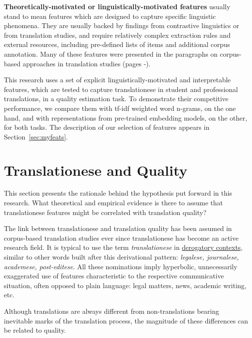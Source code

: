 \textbf{Theoretically-motivated or linguistically-motivated features} usually stand to mean features which are designed to capture specific linguistic phenomena. They are usually backed by findings from contrastive linguistics or from translation studies, and require relatively complex extraction rules and external resources, including pre-defined lists of items and additional corpus annotation. Many of these features were presented in the paragraphs on corpus-based approaches in translation studies (pages \pageref{pg:coling_begin}-\pageref{pg:coling_end}).

This research uses a set of explicit linguistically-motivated and interpretable features, which are tested to capture translationese in student and professional translations, in a quality estimation task. 
To demonstrate their competitive performance, we compare them with \gls{tf-idf} weighted word n-grams, on the one hand, and with representations from pre-trained embedding models, on the other, for both tasks. The description of our selection of features appears in Section~\ref{sec:myfeats}.

\section{\label{sec:feats4qua}Translationese and Quality}
This section presents the rationale behind the hypothesis put forward in this research. What theoretical and empirical evidence is there to assume that translationese features might be correlated with translation quality? 
 
The link between translationese and translation quality has been assumed in corpus-based translation studies ever since translationese has become an active research field. It is typical to use the term \textit{translationese} in \hyperlink{wd:evaluative}{derogatory contexts}, similar to other words built after this derivational pattern: \textit{legalese, journalese, academese, post-editese}. All these nominations imply hyperbolic, unnecessarily exaggerated use of features characteristic to the respective communicative situation, often opposed to plain language: legal matters, news, academic writing, etc. %

Although translations are always different from non-translations bearing inevitable marks of the translation process, the magnitude of these differences can be related to quality.

